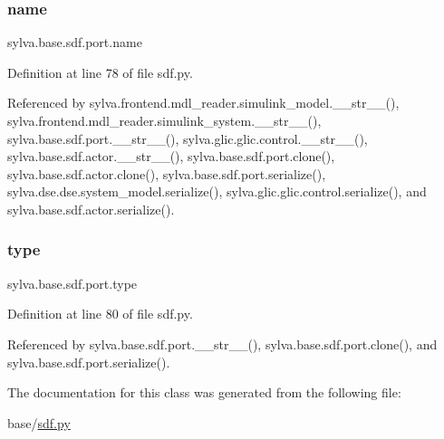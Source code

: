 \subsubsection{\texorpdfstring{name}{name}}
{\footnotesize\ttfamily sylva.\+base.\+sdf.\+port.\+name}



Definition at line 78 of file sdf.\+py.



Referenced by sylva.\+frontend.\+mdl\+\_\+reader.\+simulink\+\_\+model.\+\_\+\+\_\+str\+\_\+\+\_\+(), sylva.\+frontend.\+mdl\+\_\+reader.\+simulink\+\_\+system.\+\_\+\+\_\+str\+\_\+\+\_\+(), sylva.\+base.\+sdf.\+port.\+\_\+\+\_\+str\+\_\+\+\_\+(), sylva.\+glic.\+glic.\+control.\+\_\+\+\_\+str\+\_\+\+\_\+(), sylva.\+base.\+sdf.\+actor.\+\_\+\+\_\+str\+\_\+\+\_\+(), sylva.\+base.\+sdf.\+port.\+clone(), sylva.\+base.\+sdf.\+actor.\+clone(), sylva.\+base.\+sdf.\+port.\+serialize(), sylva.\+dse.\+dse.\+system\+\_\+model.\+serialize(), sylva.\+glic.\+glic.\+control.\+serialize(), and sylva.\+base.\+sdf.\+actor.\+serialize().

\mbox{\label{classsylva_1_1base_1_1sdf_1_1port_af04b13138d55895bfd1083eb3e772f58}} 
\subsubsection{\texorpdfstring{type}{type}}
{\footnotesize\ttfamily sylva.\+base.\+sdf.\+port.\+type}



Definition at line 80 of file sdf.\+py.



Referenced by sylva.\+base.\+sdf.\+port.\+\_\+\+\_\+str\+\_\+\+\_\+(), sylva.\+base.\+sdf.\+port.\+clone(), and sylva.\+base.\+sdf.\+port.\+serialize().



The documentation for this class was generated from the following file\+:\begin{DoxyCompactItemize}
\item 
base/\hyperlink{sdf_8py}{sdf.\+py}\end{DoxyCompactItemize}
